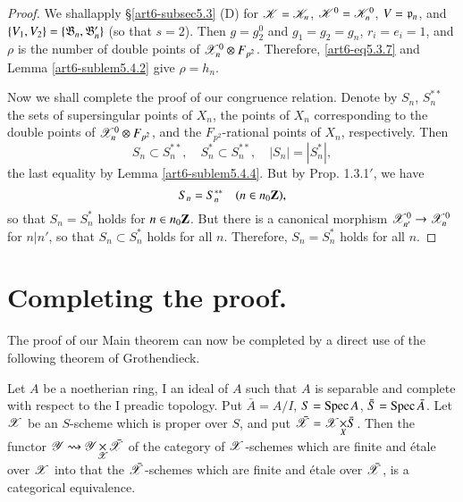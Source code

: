 \begin{proof}
We shall\pageoriginale apply \S \ref{art6-subsec5.3} (D) for $\mathscr{K} = \mathscr{K}_n$, $\mathscr{K}^0 = \mathscr{K}^0_n$, $V = \mathfrak{p}_n$, and $\{V_1, V_2\} = \{\mathfrak{B}_n, \mathfrak{B}'_n\}$ (so that $s = 2$). Then $g = g^0_2$ and $g_1 = g_2 = g_n$, $r_i = e_i = 1$, and $\rho$ is the number of double points of $\mathscr{X}^0_n \otimes F_{p^2}$. Therefore, \eqref{art6-eq5.3.7} and Lemma
\ref{art6-sublem5.4.2} give $\rho = h_n$.

Now we shall complete the proof of our congruence relation. Denote by $S_n$, $S^{\ast\ast}_n$ the sets of supersingular points of $X_n$, the points of $X_n$ corresponding to the double points of $\mathscr{X}^0_n \otimes F_{p^2}$, and the $F_{p^2}$-rational points of $X_n$, respectively. Then
$$
S_n \subset S^{\ast\ast}_n, \quad S^\ast_n \subset S^{\ast\ast}_n, \quad |S_n | = |S^\ast_n|,
$$
the last equality by Lemma \ref{art6-sublem5.4.4}. But by Prop. 1.3.1$'$, we have
$$
S_n = S^{\ast\ast}_n \quad (n \in n_0 \mathbf{Z}),
$$
so that $S_n = S^\ast_n$ holds for $n \in n_0 \mathbf{Z}$. But there is a canonical morphism $\mathscr{X}^0_{n'} \to \mathscr{X}^0_n$ for $n |n'$, so that $S_n \subset S^\ast_n$ holds for all $n$. Therefore, $S_n = S^\ast_n$ holds for all $n$.
\end{proof}

\section{Completing the proof.}\label{art6-sec6}
The proof of our Main theorem can now be completed by a direct use of the following theorem of Grothendieck.

\begin{theorem*}
Let $A$ be a noetherian ring, I an ideal of $A$ such that $A$ is separable and complete with respect to the I preadic topology. Put $\bar{A} = A / I$, $S = \operatorname{Spec} A$, $\bar{S} = \operatorname{Spec} \bar{A}$. Let $\mathscr{X}$ be an $S$-scheme which is proper over $S$, and put $\bar{\sX} = \fprod{\sX}{\bar{S}}{X}$. Then the functor $\sY \rightsquigarrow \fprod{\sY}{\bar{\sX}}{\sX}$  of the category of $\mathscr{X}$-schemes which are finite and \'etale over $\mathscr{X}$ into that the $\bar{\mathscr{X}}$-schemes which are finite and \'etale over $\bar{\mathscr{X}}$, is a categorical equivalence.
\end{theorem*}

